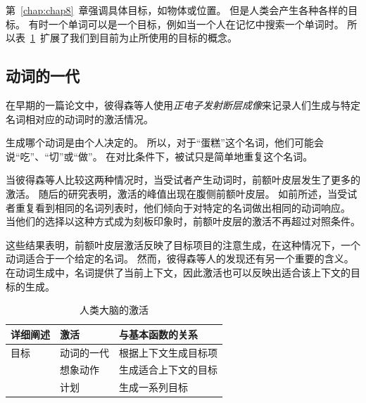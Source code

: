 第~\ref{chap:chap8}~章强调具体目标，如物体或位置。
但是人类会产生各种各样的目标。
有时一个单词可以是一个目标，例如当一个人在记忆中搜索一个单词时。
所以表~\ref{tab:9_2}~扩展了我们到目前为止所使用的目标的概念。



\subsection{动词的一代}
\par
在早期的一篇论文中，彼得森等人\cite{petersen1988positron}使用\textit{正电子发射断层成像}来记录人们生成与特定名词相对应的动词时的激活情况。
\par

生成哪个动词是由个人决定的。
所以，对于“蛋糕”这个名词，他们可能会说“吃”、“切”或“做”。
在对比条件下，被试只是简单地重复这个名词。
\par

当彼得森等人比较这两种情况时，当受试者产生动词时，前额叶皮层发生了更多的激活。
随后的研究表明，激活的峰值出现在腹侧前额叶皮层\cite{buckner1995dissociation}。
如前所述，当受试者重复看到相同的名词列表时，他们倾向于对特定的名词做出相同的动词响应\cite{raichle1994practice}。
当他们的选择以这种方式成为刻板印象时，前额叶皮层的激活不再超过对照条件。
\par


这些结果表明，前额叶皮层激活反映了目标项目的注意生成，在这种情况下，一个动词适合于一个给定的名词。
然而，彼得森等人的发现还有另一个重要的含义。
在动词生成中，名词提供了当前上下文，因此激活也可以反映出适合该上下文的目标的生成。
\par


\begin{table}[htbp] 
	\newcommand{\tabincell}[2]{\begin{tabular}{@{}#1@{}}#2\end{tabular}} %
	\centering
	\caption{人类大脑的激活\label{tab:9_2}}
	\renewcommand\arraystretch{1.5}	%
	\begin{tabular}{lll}
		\toprule
		详细阐述 & 激活 & 与基本函数的关系\\
		\midrule
		目标 & 动词的一代 & 根据上下文生成目标项  \\
		& 想象动作 & 生成适合上下文的目标 \\
		&  计划 & 生成一系列目标 \\
		\bottomrule
		
	\end{tabular}%
\end{table}%


